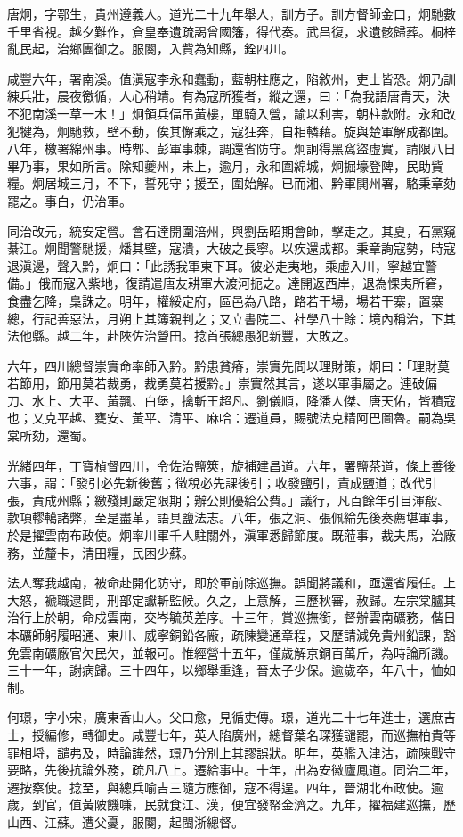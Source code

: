 \begin{pinyinscope}
唐炯，字鄂生，貴州遵義人。道光二十九年舉人，訓方子。訓方督師金口，炯馳數千里省視。越夕難作，倉皇奉遺疏謁曾國籓，得代奏。武昌復，求遺骸歸葬。桐梓亂民起，治鄉團御之。服闋，入貲為知縣，銓四川。

咸豐六年，署南溪。值滇寇李永和蠢動，藍朝柱應之，陷敘州，吏士皆恐。炯乃訓練兵壯，晨夜徼循，人心稍靖。有為寇所獲者，縱之還，曰：「為我語唐青天，決不犯南溪一草一木！」炯領兵偪吊黃樓，單騎入營，諭以利害，朝柱款附。永和改犯犍為，炯馳救，壁不動，俟其懈乘之，寇狂奔，自相轔藉。旋與楚軍解成都圍。八年，檄署綿州事。時郫、彭軍事棘，調還省防守。炯詗得黑窩盜虛實，請限八日畢乃事，果如所言。除知夔州，未上，逾月，永和圍綿城，炯掘壕登陴，民助貲糧。炯居城三月，不下，誓死守；援至，圍始解。已而湘、黔軍閧州署，駱秉章劾罷之。事白，仍治軍。

同治改元，統安定營。會石達開圍涪州，與劉岳昭期會師，擊走之。其夏，石黨窺綦江。炯聞警馳援，燔其壁，寇潰，大破之長寧。以疾還成都。秉章詢寇勢，時寇退滇邊，聲入黔，炯曰：「此誘我軍東下耳。彼必走夷地，乘虛入川，寧越宜警備。」俄而寇入紫地，復請遣唐友耕軍大渡河扼之。達開返西岸，退為惈夷所窘，食盡乞降，梟誅之。明年，權綏定府，區邑為八路，路若干場，場若干寨，置寨總，行記善惡法，月朔上其簿親判之；又立書院二、社學八十餘：境內稱治，下其法他縣。越二年，赴陜佐治營田。捻首張總愚犯新豐，大敗之。

六年，四川總督崇實命率師入黔。黔患貧瘠，崇實先問以理財策，炯曰：「理財莫若節用，節用莫若裁勇，裁勇莫若援黔。」崇實然其言，遂以軍事屬之。連破偏刀、水上、大平、黃飄、白堡，擒斬王超凡、劉儀順，降潘人傑、唐天佑，皆積寇也；又克平越、甕安、黃平、清平、麻哈：遷道員，賜號法克精阿巴圖魯。嗣為吳棠所劾，還蜀。

光緒四年，丁寶楨督四川，令佐治鹽筴，旋補建昌道。六年，署鹽茶道，條上善後六事，謂：「發引必先新後舊；徵稅必先課後引；收發鹽引，責成鹽道；改代引張，責成州縣；繳殘則嚴定限期；辦公則優給公費。」議行，凡百餘年引目渾殽、款項轇轕諸弊，至是盡革，語具鹽法志。八年，張之洞、張佩綸先後奏薦堪軍事，於是擢雲南布政使。炯率川軍千人駐關外，滇軍悉歸節度。既蒞事，裁夫馬，治廠務，並釐卡，清田糧，民困少蘇。

法人奪我越南，被命赴開化防守，即於軍前除巡撫。誤聞將議和，亟還省履任。上大怒，褫職逮問，刑部定讞斬監候。久之，上意解，三歷秋審，赦歸。左宗棠臚其治行上於朝，命戍雲南，交岑毓英差序。十三年，賞巡撫銜，督辦雲南礦務，偕日本礦師躬履昭通、東川、威寧銅鉛各廠，疏陳變通章程，又歷請減免貴州鉛課，豁免雲南礦廠官欠民欠，並報可。惟經營十五年，僅歲解京銅百萬斤，為時論所譏。三十一年，謝病歸。三十四年，以鄉舉重逢，晉太子少保。逾歲卒，年八十，恤如制。

何璟，字小宋，廣東香山人。父曰愈，見循吏傳。璟，道光二十七年進士，選庶吉士，授編修，轉御史。咸豐七年，英人陷廣州，總督葉名琛獲譴罷，而巡撫柏貴等罪相埒，譴弗及，時論譁然，璟乃分別上其謬誤狀。明年，英艦入津沽，疏陳戰守要略，先後抗論外務，疏凡八上。遷給事中。十年，出為安徽廬鳳道。同治二年，遷按察使。捻至，與總兵喻吉三隨方應御，寇不得逞。四年，晉湖北布政使。逾歲，到官，值黃陂饑嗛，民就食江、漢，便宜發帑金濟之。九年，擢福建巡撫，歷山西、江蘇。遭父憂，服闋，起閩浙總督。


\end{pinyinscope}
